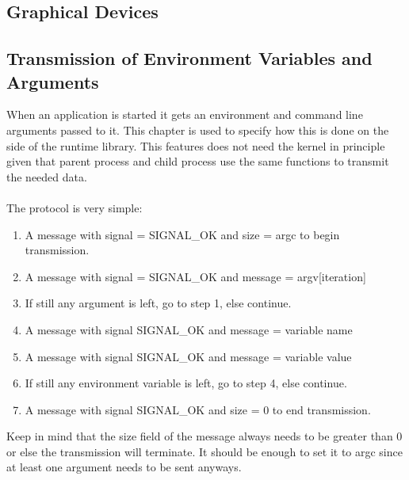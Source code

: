 \subsection{Graphical Devices}

\subsection{Transmission of Environment Variables and Arguments}
When an application is started it gets an environment and command line arguments passed to it.
This chapter is used to specify how this is done on the side of the runtime library. This features does
not need the kernel in principle given that parent process and child process use the same
functions to transmit the needed data. \\ \\
The protocol is very simple:
\begin{enumerate}
 \item A message with signal = SIGNAL\_OK and size = argc to begin transmission.
 \item A message with signal = SIGNAL\_OK and message = argv[iteration]
 \item If still any argument is left, go to step 1, else continue.
 \item A message with signal SIGNAL\_OK and message = variable name
 \item A message with signal SIGNAL\_OK and message = variable value
 \item If still any environment variable is left, go to step 4, else continue.
 \item A message with signal SIGNAL\_OK and size = 0 to end transmission.
\end{enumerate}
Keep in mind that the size field of the message always needs to be greater than 0 or else the transmission will terminate.
It should be enough to set it to argc since at least one argument needs to be sent anyways.

